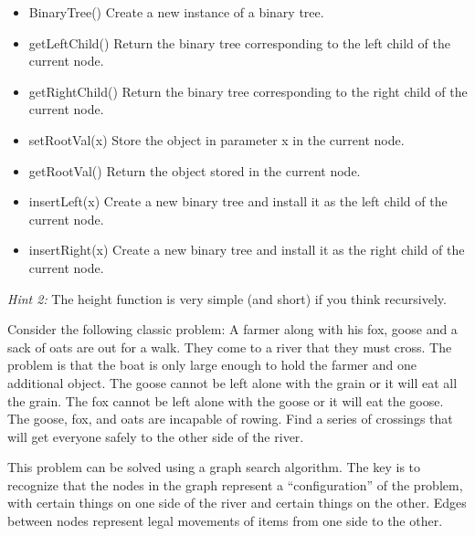 \documentclass[11pt]{exam}
\begin{document}
\begin{questions}
\begin{itemize}
	\item BinaryTree()  Create a new instance of a binary tree.
    \item getLeftChild() Return the binary tree corresponding to the left child of the current node.
    \item getRightChild() Return the binary tree corresponding to the right child of the current node.
    \item setRootVal(x) Store the object in parameter x in the current node.
    \item getRootVal() Return the object stored in the current node.
    \item insertLeft(x) Create a new binary tree and install it as the left child of the current node.
    \item insertRight(x) Create a new binary tree and install it as the right child of the current node.

\end{itemize}

\textit{Hint 2:} The height function is very simple (and short) if you think recursively.

\newpage
\question  Consider the following classic problem:  A farmer along with his fox, goose and a sack of oats are out for a walk.  They come to a river that they must cross.  The problem is that the boat is only large enough to hold the farmer and one additional object.  The goose cannot be left alone with the grain or it will eat all the grain.  The fox cannot be left alone with the goose or it will eat the goose.  The goose, fox, and oats are incapable of rowing.  Find a series  of crossings that will get everyone safely to the other side of the river.

This problem can be solved using a graph search algorithm.  The key is to recognize that the nodes in the graph represent a ``configuration'' of the problem, with certain things on one side of the river and certain things on the other.  Edges between nodes represent legal movements of items from one side to the other.

\vspace{8in}


\end{questions}
\end{document}
